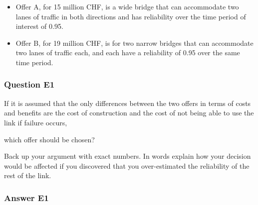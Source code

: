 \begin{itemize}
	\item Offer A, for 15 million CHF, is a wide bridge that can accommodate two lanes of
traffic in both directions and has reliability over the time period of interest
of 0.95.
	\item Offer B, for 19 million CHF, is for two narrow bridges that can accommodate two
lanes of traffic each, and each have a reliability of 0.95 over the same time
period.
\end{itemize}
\subsubsection{Question E1}


If it is assumed that the only differences between the two offers in terms of
costs and benefits are the cost of construction and the cost of not being able to
use the link if failure occurs,

which offer should be chosen?

Back up your argument with exact numbers. In words explain how your decision
would be affected if you discovered that you over-estimated the reliability of
the rest of the link.

\subsubsection{Answer E1}

